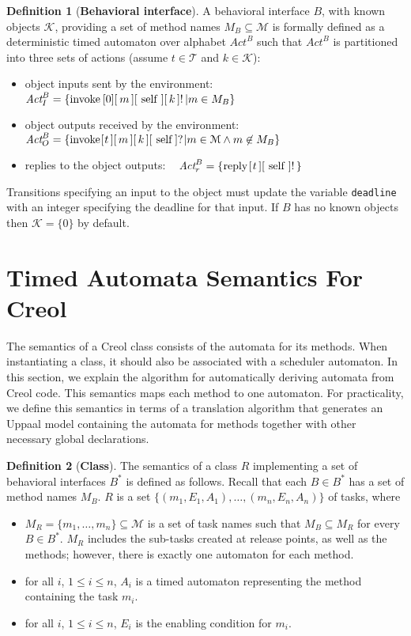 \documentclass[copyright,creativecommons]{eptcs}
\theoremstyle{definition}
\newtheorem{definition}{Definition}
\newcommand{\M}{\mathcal{M}}
\newcommand{\Act}{\textit{Act}\xspace}
\newcommand{\Uppaal}{{\sc Uppaal}\xspace}
\begin{document}
\begin{definition}[\bf Behavioral interface]\label{def:behavioral_interface}
A behavioral interface $B$, with known objects $\mathcal{K}$, providing a set of method names $M_B \subseteq \M$ is formally defined as a deterministic timed automaton over alphabet $\Act^B$  such that $\Act^B$ is partitioned into three sets of actions (assume $t \in \mathcal{T}$ and $k \in \mathcal{K}$):
\begin{itemize}
\item object inputs sent by the environment:
~ $ \Act_I^B = \{\lstinline+invoke[0][+m\lstinline+][self][+k\lstinline+]!+|m \in M_B \}$
\item object outputs received by the environment:
~ $\Act_O^B = \{\lstinline+invoke[+t\lstinline+][+m\lstinline+][+k\lstinline+][self]?+|m \in \M \wedge m \not \in M_B \}$
\item replies to the object outputs:
~ $\Act_r^B = \{\lstinline+reply[+t\lstinline+][self]!+\}$
\end{itemize}
Transitions specifying an input to the object must update the variable \lstinline$deadline$ with an integer specifying the deadline for that input.
If $B$ has no known objects then $\mathcal{K} = \{0\}$ by default.
\end{definition}


\section{Timed Automata Semantics For Creol}\label{sec::translation}


The semantics of a Creol class consists of the automata for its methods. When instantiating a class, it should also be associated with a scheduler automaton.
In this section, we explain the algorithm for automatically deriving automata from Creol code.
This semantics maps each method to one automaton.
For practicality, we define this semantics in terms of a translation algorithm
that generates an \Uppaal model containing the automata for methods together with other necessary global declarations.


\begin{definition}[\bf Class]\label{def:class}
The semantics of a class $R$ implementing a set of behavioral interfaces $B^*$ is defined as follows.
Recall that each $B \in B^*$ has a set of method names $M_B$.
$R$ is a set $\{(m_1,E_1,A_1), \ldots, (m_n,E_n,A_n)\}$ of tasks, where
\begin{itemize}
\item $M_R=\{m_1,\dots,m_n\} \subseteq \M$ is a set of task names such that $ M_B \subseteq M_R$ for every $B \in B^*$.
$M_R$ includes the sub-tasks created at release points, as well as the methods; however, there is exactly one automaton for each method.
\item for all $i$, $1 \leq i \leq n$, $A_i$ is a timed automaton representing the method containing the task $m_i$. \item for all $i$, $1 \leq i \leq n$, $E_i$ is the enabling condition for $m_i$.
\end{itemize}
\end{definition}
\end{document}
